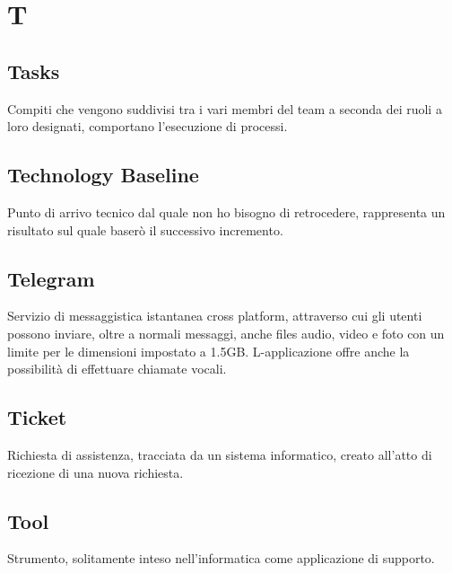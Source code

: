 \section*{T}

\subsection{Tasks}
Compiti che vengono suddivisi tra i vari membri del team a seconda dei ruoli a loro designati, comportano l'esecuzione di processi.

\subsection{Technology Baseline}
Punto di arrivo tecnico dal quale non ho bisogno di retrocedere, rappresenta un risultato sul quale baserò il successivo incremento.

\subsection{Telegram}
Servizio di messaggistica istantanea cross platform, attraverso cui gli utenti possono inviare, oltre a normali messaggi, anche files audio, video e foto con un limite per le dimensioni impostato a 1.5GB. L-applicazione offre anche la possibilità di effettuare chiamate vocali.

\subsection{Ticket}
Richiesta di assistenza, tracciata da un sistema informatico, creato all'atto di ricezione di una nuova richiesta.

\subsection{Tool}
Strumento, solitamente inteso nell'informatica come applicazione di supporto.



